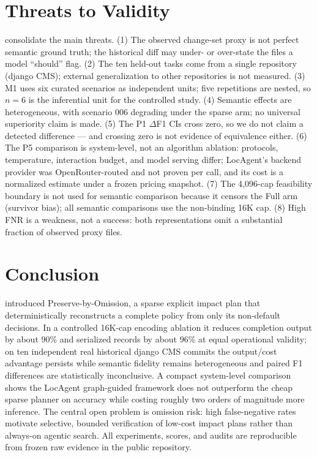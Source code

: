 \section{Threats to Validity}
 consolidate the main threats. (1) The observed
change-set proxy is not perfect semantic ground truth; the historical diff may
under- or over-state the files a model ``should'' flag. (2) The ten held-out
tasks come from a single repository (django CMS); external generalization to
other repositories is not measured. (3) M1 uses six curated scenarios as
independent units; five repetitions are nested, so $n=6$ is the inferential
unit for the controlled study. (4) Semantic effects are heterogeneous, with
scenario 006 degrading under the sparse arm; no universal superiority claim is
made. (5) The P1 $\Delta$F1 CIs cross zero, so we do not claim a detected
difference --- and crossing zero is not evidence of equivalence either. (6) The
P5 comparison is system-level, not an algorithm ablation: protocols,
temperature, interaction budget, and model serving differ; LocAgent's backend
provider was OpenRouter-routed and not proven per call, and its cost is a
normalized estimate under a frozen pricing snapshot. (7) The 4,096-cap
feasibility boundary is not used for semantic comparison because it censors
the Full arm (survivor bias); all semantic comparisons use the non-binding 16K
cap. (8) High FNR is a weakness, not a success: both representations omit a
substantial fraction of observed proxy files.

\section{Conclusion}
 introduced Preserve-by-Omission, a sparse explicit impact
plan that deterministically reconstructs a complete policy from only its
non-default decisions. In a controlled 16K-cap encoding ablation it reduces
completion output by about 90\% and serialized records by about 96\% at equal
operational validity; on ten independent real historical django CMS commits the
output/cost advantage persists while semantic fidelity remains heterogeneous
and paired F1 differences are statistically inconclusive. A compact
system-level comparison shows the LocAgent graph-guided framework does not
outperform the cheap sparse planner on accuracy while costing roughly two
orders of magnitude more inference. The central open problem is omission risk:
high false-negative rates motivate selective, bounded verification of
low-cost impact plans rather than always-on agentic search. All experiments,
scores, and audits are reproducible from frozen raw evidence in the public
repository.

